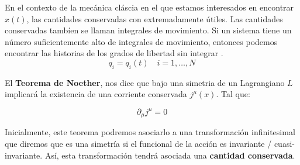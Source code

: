 \documentclass[../main.tex]{subfiles}
\begin{document}
En el contexto de la mecánica cláscia en el que estamos interesados en encontrar $x(t)$, las cantidades conservadas con extremadamente útiles. Las cantidades conservadas tambíen se llaman integrales de movimiento.  Si un sistema tiene un número suficientemente alto de integrales de movimiento, entonces podemos encontrar las historias de los grados de libertad sin integrar . \\
\begin{equation}
    q_i=q_i(t) \quad i=1,\dots ,N
\end{equation}

El \textbf{Teorema de Noether}, nos dice que bajo una simetria de un Lagrangiano $L$ implicará la existencia de una corriente conservada $j^{\mu}(x)$. Tal que: 

\begin{equation}
    \partial_{\mu} j^{\mu} = 0 \label{corriente-conservada}
\end{equation}

Inicialmente, este teorema podremos asociarlo a una transformación infinitesimal que diremos que es una simetría si el funcional de la acción es invariante / cuasi-invariante. Así, esta transformación tendrá asociada una \textbf{cantidad conservada}. \\

\end{document}
